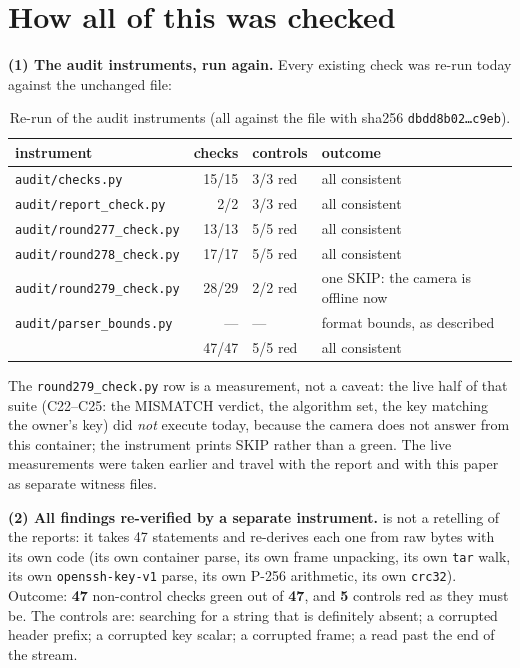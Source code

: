 \documentclass[12pt]{article}
\newcommand{\code}[1]{\texttt{\small #1}}
\newcommand{\lc}[1]{\texttt{\small #1}}
\newcommand{\hx}[1]{\texttt{\footnotesize #1}}
\begin{document}
\section{How all of this was checked}
\label{sec:verification}

\textbf{(1) The audit instruments, run again.} Every existing check was re-run today against
the unchanged file:

\begin{table}[htbp]\centering
\small
\caption{Re-run of the audit instruments (all against the file with sha256
\hx{dbdd8b02\ldots c9eb}).}
\label{tab:runs}
\begin{tabular}{lrll}
\toprule
instrument & checks & controls & outcome \\
\midrule
\code{audit/checks.py} & 15/15 & 3/3 red & all consistent \\
\lc{audit/re\allowbreak port\_che\allowbreak ck.py} & 2/2 & 3/3 red & all consistent \\
\lc{audit/ro\allowbreak und277\_c\allowbreak heck.py} & 13/13 & 5/5 red & all consistent \\
\lc{audit/ro\allowbreak und278\_c\allowbreak heck.py} & 17/17 & 5/5 red & all consistent \\
\lc{audit/ro\allowbreak und279\_c\allowbreak heck.py} & 28/29 & 2/2 red & one SKIP: the camera is offline now \\
\lc{audit/pa\allowbreak rser\_bou\allowbreak nds.py} & --- & --- & format bounds, as described \\
 & 47/47 & 5/5 red & all consistent \\
\bottomrule
\end{tabular}
\end{table}

The \code{round279\_check.py} row is a measurement, not a caveat: the live half of that suite
(C22--C25: the MISMATCH verdict, the algorithm set, the key matching the owner's key) did
\emph{not} execute today, because the camera does not answer from this container; the
instrument prints SKIP rather than a green. The live measurements were taken earlier and
travel with the report and with this paper as separate witness files.

\textbf{(2) All findings re-verified by a separate instrument.}
 is not a retelling of the reports: it takes 47 statements and
re-derives each one from raw bytes with its own code (its own container parse, its own frame
unpacking, its own \code{tar} walk, its own \code{openssh-key-v1} parse, its own P-256
arithmetic, its own \code{crc32}). Outcome: \textbf{47} non-control checks green out of
\textbf{47}, and \textbf{5} controls red as they must be. The controls are: searching for a
string that is definitely absent; a corrupted header prefix; a corrupted key scalar; a
corrupted frame; a read past the end of the stream.
\end{document}
